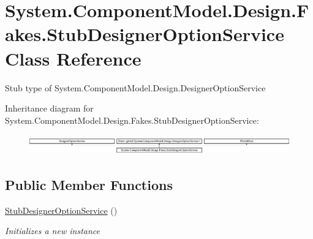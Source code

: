 \hypertarget{class_system_1_1_component_model_1_1_design_1_1_fakes_1_1_stub_designer_option_service}{\section{System.\-Component\-Model.\-Design.\-Fakes.\-Stub\-Designer\-Option\-Service Class Reference}
\label{class_system_1_1_component_model_1_1_design_1_1_fakes_1_1_stub_designer_option_service}
}


Stub type of System.\-Component\-Model.\-Design.\-Designer\-Option\-Service 


Inheritance diagram for System.\-Component\-Model.\-Design.\-Fakes.\-Stub\-Designer\-Option\-Service\-:\begin{figure}[H]
\begin{center}
\leavevmode
\includegraphics[height=0.866203cm]{class_system_1_1_component_model_1_1_design_1_1_fakes_1_1_stub_designer_option_service}
\end{center}
\end{figure}
\subsection*{Public Member Functions}
\begin{DoxyCompactItemize}
\item 
\hyperlink{class_system_1_1_component_model_1_1_design_1_1_fakes_1_1_stub_designer_option_service_aeb9848e894cd7d56753edcafa1fb2285}{Stub\-Designer\-Option\-Service} ()
\begin{DoxyCompactList}\small\item\em Initializes a new instance\end{DoxyCompactList}\end{DoxyCompactItemize}
